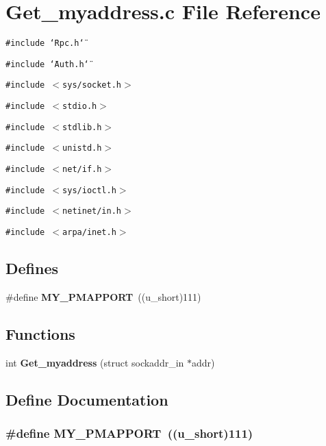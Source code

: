 \section{Get\_\-myaddress.c File Reference}
\label{Get__myaddress_8c}
{\tt \#include \char`\"{}Rpc.h\char`\"{}}\par
{\tt \#include \char`\"{}Auth.h\char`\"{}}\par
{\tt \#include $<$sys/socket.h$>$}\par
{\tt \#include $<$stdio.h$>$}\par
{\tt \#include $<$stdlib.h$>$}\par
{\tt \#include $<$unistd.h$>$}\par
{\tt \#include $<$net/if.h$>$}\par
{\tt \#include $<$sys/ioctl.h$>$}\par
{\tt \#include $<$netinet/in.h$>$}\par
{\tt \#include $<$arpa/inet.h$>$}\par
\subsection*{Defines}
\begin{CompactItemize}
\item 
\#define {\bf MY\_\-PMAPPORT}\ ((u\_\-short)111)
\end{CompactItemize}
\subsection*{Functions}
\begin{CompactItemize}
\item 
int {\bf Get\_\-myaddress} (struct sockaddr\_\-in $\ast$addr)
\end{CompactItemize}


\subsection{Define Documentation}
\subsubsection{\setlength{\rightskip}{0pt plus 5cm}\#define MY\_\-PMAPPORT\ ((u\_\-short)111)}\label{Get__myaddress_8c_a0}





